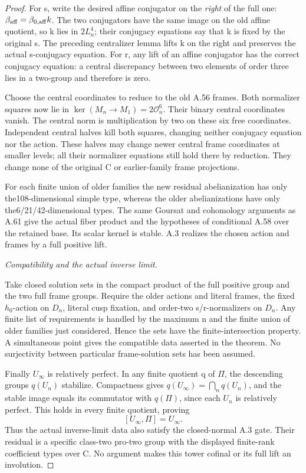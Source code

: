 \begin{proof}
For s, write the desired affine conjugator on the
\emph{right} of the full one: \(\beta_{\rm aff}
=\beta_{0,\rm aff}k\). The two conjugators have the
same image on the old affine quotient, so k lies in
\(2L_n^4\); their conjugacy equations say that k is
fixed by the original s. The preceding centralizer
lemma lifts k on the right and preserves the actual
s-conjugacy equation. For r, any lift of an affine
conjugator has the correct conjugacy equation: a
central discrepancy between two elements of order
three lies in a two-group and therefore is zero.

Choose the central coordinates to reduce to the old
A.56 frames. Both normalizer squares now lie in
\(\ker(M_n\to M_1)=2\mathcal O_n^6\).
Their binary central coordinates vanish. The central
norm is multiplication by two on these six free
coordinates. Independent central halves kill both
squares, changing neither conjugacy equation nor
the action. These halves may change newer central
frame coordinates at smaller levels; all their
normalizer equations still hold there by reduction.
They change none of the original C or earlier-family
frame projections.

For each finite union of older families the new
residual abelianization has only the108-dimensional
simple type, whereas the older abelianizations have
only the6/21/42-dimensional types. The same Goursat
and cohomology arguments as A.61 give the actual
fiber product and the hypotheses of conditional
A.58 over the retained base. Its scalar kernel is
stable. A.3 realizes the chosen action and frames
by a full positive lift.

\emph{Compatibility and the actual inverse limit.}\par
Take closed solution sets in the compact product of
the full positive group and the two full frame
groups. Require the older actions and literal
frames, the fixed \(h_0\)-action on \(D_n\), literal
cusp fixation, and order-two s/r-normalizers on
\(D_n\). Any finite list of requirements is handled
by the maximum n and the finite union of older
families just considered. Hence the sets have the
finite-intersection property. A simultaneous point
gives the compatible data asserted in the theorem.
No surjectivity between particular frame-solution
sets has been assumed.

Finally \(U_\infty\) is relatively perfect. In any
finite quotient q of \(\Pi\), the descending groups
\(q(U_n)\) stabilize. Compactness gives
\(q(U_\infty)=\bigcap_n q(U_n)\), and the stable
image equals its commutator with \(q(\Pi)\), since
each \(U_n\) is relatively perfect. This holds in
every finite quotient, proving
\[
 [U_\infty,\Pi]=U_\infty.
 \tag{A.62.5}
\]
Thus the actual inverse-limit data also satisfy
the closed-normal A.3 gate. Their residual is a
specific class-two pro-two group with the displayed
finite-rank coefficient types over C. No argument
makes this tower cofinal or its full lift an
involution.
\end{proof}


